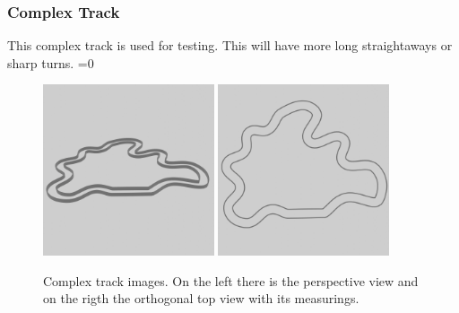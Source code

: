 \documentclass[14pt]{extarticle}
\newcounter{debug}
\begin{document}
\begin{flushleft}
	\subsubsection{Complex Track}
	This complex track is used for testing. This will have more long straightaways or sharp turns.
	\ifnum\value{debug}=0 {
	\begin{figure}[H]
    		\centering\includegraphics[width=0.45\textwidth]{./Image/Environment/Med/perspective.png}
    		\centering\includegraphics[width=0.45\textwidth]{./Image/Environment/Med/top.png}
		\vspace{5mm}
		\caption{Complex track images. On the left there is the perspective view and on the rigth the orthogonal top view with its measurings.}
	\end{figure}
	}\fi
	

\end{flushleft}
\end{document}
